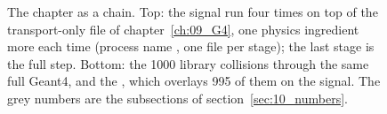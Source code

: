 \begin{figure}[!htb]
\caption{The chapter as a chain. Top: the signal run four times on top of the transport-only file of
chapter~\ref{ch:09_G4}, one physics ingredient more each time (process name , one file per stage);
the last stage is the full  step. Bottom: the 1000 library collisions through the same full Geant4, and the
, which overlays 995 of them on the signal. The grey numbers are the subsections of
section~\ref{sec:10_numbers}.}
\label{fig:10_chain}
\end{figure}

